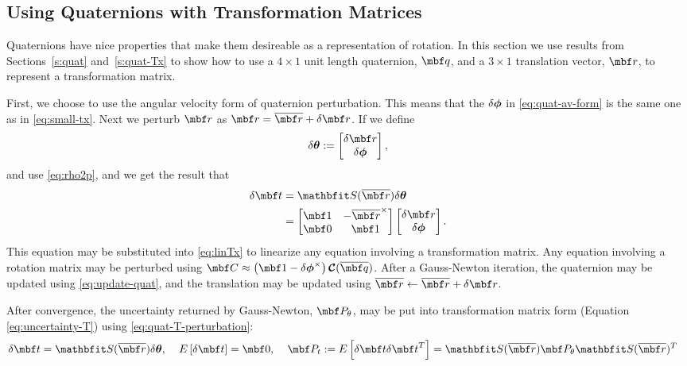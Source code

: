 \documentclass[11pt,a4,oneside]{article}
\begin{document}
\subsection{Using Quaternions with Transformation Matrices \label{s:quat-Tx}}
Quaternions have nice properties that make them desireable as a representation of rotation. In this section we use results from Sections~\ref{s:quat} and~\ref{s:quat-Tx} to show how to use a $4 \times 1$ unit length quaternion, $\mbf q$, and a $3 \times 1$ translation vector, $\mbf r$, to represent a transformation matrix.

First, we choose to use the angular velocity form of quaternion perturbation. This means that the ${\delta {\boldsymbol{\phi}}}$ in \eqref{eq:quat-av-form} is the same one as in \eqref{eq:small-tx}. Next we perturb $\mbf r$ as $\mbf r = \mbfbar r + \mbfdel r$. If we define
\begin{equation}
  \label{eq:quat-T-dtheta}
  \mbsdel \theta := \bbm \mbfdel r \\ \mbsdel \phi \ebm,
\end{equation}
 and use \eqref{eq:rho2p}, and we get the result that
\begin{subequations}
\label{eq:quat-T-perturbation}
\begin{flalign}
  \mbfdel t & = \mbfh S(\mbfbar r) \mbsdel \theta \\ 
    &=   \bbm
      \mbf 1 & -\mbfbar r^\times \\ 
      \mbf 0 & \mbf 1
    \ebm
    \bbm
      \mbfdel r \\
      \mbsdel \phi
    \ebm.
\end{flalign}
\end{subequations}
This equation may be substituted into \eqref{eq:linTx} to linearize any equation involving a transformation matrix. Any equation involving a rotation matrix may be perturbed using $\mbf C \approx \left(\mbf 1 - \mbsdel \phi^\times\right)\mbc C(\mbfbar q)$. After a Gauss-Newton iteration, the quaternion may be updated using \eqref{eq:update-quat}, and the translation may be updated using $\mbfbar r \leftarrow \mbfbar r + \mbfdel r$. 

After convergence, the uncertainty returned by Gauss-Newton, $\mbf P_{\theta}$, may be put into transformation matrix form (Equation \eqref{eq:uncertainty-T}) using \eqref{eq:quat-T-perturbation}:
\begin{subequations}
  \label{eq:quat-to-T-uncertainty}
  \begin{flalign}
    \mbfdel t & = \mbfh S(\mbfbar r) \mbsdel \theta, \;\;\;\; E\left[\mbfdel t \right] = \mbf 0, \;\;\;\; \mbf P_{t} :=E\left[\mbfdel t \mbfdel t^T \right] = \mbfh S(\mbfbar r) \mbf P_{\theta} \mbfh S(\mbfbar r)^T
  \end{flalign}
\end{subequations}
\end{document}
